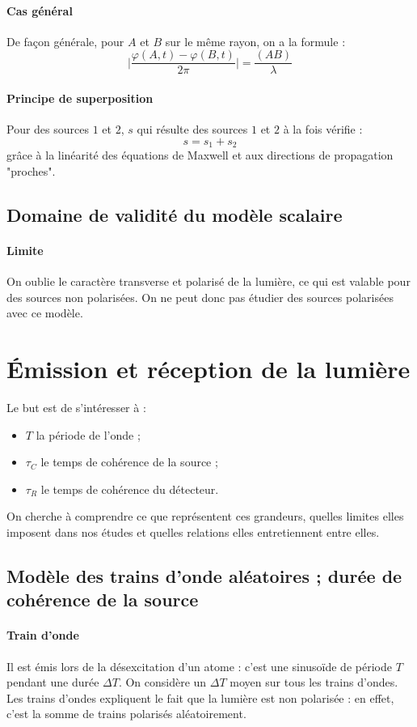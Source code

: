 \documentclass[french]{book}
\theoremstyle{plain}
\theoremstyle{definition}
\theoremstyle{remark}
\begin{document}
\paragraph{Cas général}
De façon générale, pour $A$ et $B$ sur le même rayon, on a la formule : $$\bigg\lvert\frac{\varphi(A,t)-\varphi(B,t)}{2\pi}\bigg\rvert=\frac{(AB)}{\lambda}$$
\paragraph{Principe de superposition} Pour des sources $1$ et $2$, $s$ qui résulte des sources $1$ et $2$ à la fois vérifie : $$s=s_1+s_2$$ grâce à la linéarité des équations de Maxwell et aux directions de propagation "proches".
\subsection{Domaine de validité du modèle scalaire}
\paragraph{Limite} On oublie le caractère transverse et polarisé de la lumière, ce qui est valable pour des sources non polarisées. On ne peut donc pas étudier des sources polarisées avec ce modèle.
\section{Émission et réception de la lumière}
Le but est de s'intéresser à :
\begin{itemize}
	\item $T$ la période de l'onde ;
	\item $\tau_C$ le temps de cohérence de la source ;
	\item $\tau_R$ le temps de cohérence du détecteur.
\end{itemize}
On cherche à comprendre ce que représentent ces grandeurs, quelles limites elles imposent dans nos études et quelles relations elles entretiennent entre elles.
\subsection{Modèle des trains d'onde aléatoires ; durée de cohérence de la source}
\paragraph{Train d’onde} Il est émis lors de la désexcitation d’un atome : c'est une sinusoïde de période $T$ pendant une durée $\Delta T$. On considère un $\Delta T$ moyen sur tous les trains d’ondes. Les trains d'ondes expliquent le fait que la lumière est non polarisée : en effet, c'est la somme de trains polarisés aléatoirement.
\end{document}
